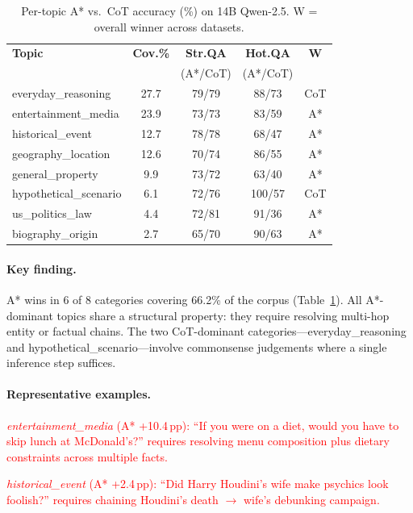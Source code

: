 \documentclass[11pt]{article}
\begin{document}
{\begin{table}[ht]
\centering
\small
\setlength{\tabcolsep}{3pt}
\begin{tabular}{lcccc}
\toprule
\textbf{Topic} & \textbf{Cov.\%} & \textbf{Str.QA} & \textbf{Hot.QA} & \textbf{W} \\
& & (A*/CoT) & (A*/CoT) & \\
\midrule
everyday\_reasoning & 27.7 & 79/79 & 88/73 & CoT \\
entertainment\_media & 23.9 & 73/73 & 83/59 & A* \\
historical\_event & 12.7 & 78/78 & 68/47 & A* \\
geography\_location & 12.6 & 70/74 & 86/55 & A* \\
general\_property & 9.9 & 73/72 & 63/40 & A* \\
hypothetical\_scenario & 6.1 & 72/76 & 100/57 & CoT \\
us\_politics\_law & 4.4 & 72/81 & 91/36 & A* \\
biography\_origin & 2.7 & 65/70 & 90/63 & A* \\
\bottomrule
\end{tabular}
\caption{Per-topic A* vs.\ CoT accuracy (\%) on 14B Qwen-2.5. W = overall winner across datasets.}
\label{tab:topic_results}
\end{table}

\paragraph{Key finding.} A* wins in 6 of 8 categories covering 66.2\% of the corpus (Table~\ref{tab:topic_results}). All A*-dominant topics share a structural property: they require resolving multi-hop entity or factual chains. The two CoT-dominant categories---everyday\_reasoning and hypothetical\_scenario---involve commonsense judgements where a single inference step suffices.

\paragraph{Representative examples.}
\textcolor{red}{\emph{entertainment\_media} (A* +10.4\,pp): ``If you were on a diet, would you have to skip lunch at McDonald's?'' requires resolving menu composition plus dietary constraints across multiple facts.}

\textcolor{red}{\emph{historical\_event} (A* +2.4\,pp): ``Did Harry Houdini's wife make psychics look foolish?'' requires chaining Houdini's death $\to$ wife's debunking campaign.}

}
\end{document}
